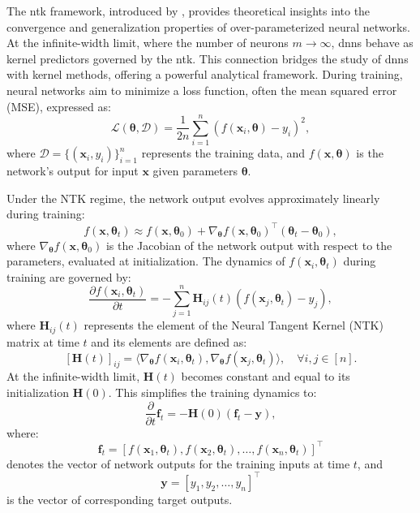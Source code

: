 

The \ac{ntk} framework, introduced by \citet{jacot2018neural}, provides theoretical insights into the convergence and generalization properties of over-parameterized neural networks. At the infinite-width limit, where the number of neurons \( m \to \infty \), \acp{dnn} behave as kernel predictors governed by the \ac{ntk}. This connection bridges the study of \acp{dnn} with kernel methods, offering a powerful analytical framework. During training, neural networks aim to minimize a loss function, often the mean squared error (MSE), expressed as:
\[
\mathcal{L}(\boldsymbol{\theta}, \mathcal{D}) = \frac{1}{2n} \sum_{i=1}^n (f(\mathbf{x}_i, \boldsymbol{\theta}) - y_i)^2,
\]
where \( \mathcal{D} = \{(\mathbf{x}_i, y_i)\}_{i=1}^n \) represents the training data, and \( f(\mathbf{x}, \boldsymbol{\theta}) \) is the network's output for input \( \mathbf{x} \) given parameters \( \boldsymbol{\theta} \).

Under the NTK regime, the network output evolves approximately linearly during training:
\[
f(\mathbf{x}, \boldsymbol{\theta}_t) \approx f(\mathbf{x}, \boldsymbol{\theta}_0) + \nabla_{\boldsymbol{\theta}} f(\mathbf{x}, \boldsymbol{\theta}_0)^\top (\boldsymbol{\theta}_t - \boldsymbol{\theta}_0),
\]
where \( \nabla_{\boldsymbol{\theta}} f(\mathbf{x}, \boldsymbol{\theta}_0) \) is the Jacobian of the network output with respect to the parameters, evaluated at initialization. The dynamics of \( f(\mathbf{x}_i, \boldsymbol{\theta}_t) \) during training are governed by:
\[
\frac{\partial f(\mathbf{x}_i, \boldsymbol{\theta}_t)}{\partial t} = -\sum_{j=1}^n \mathbf{H}_{ij}(t) \left( f(\mathbf{x}_j, \boldsymbol{\theta}_t) - y_j \right),
\]
where \( \mathbf{H}_{ij}(t) \) represents the element of the Neural Tangent Kernel (NTK) matrix at time \( t \) and its elements are defined as:
\[
[\mathbf{H}(t)]_{ij} = \langle \nabla_{\boldsymbol{\theta}} f(\mathbf{x}_i, \boldsymbol{\theta}_t), \nabla_{\boldsymbol{\theta}} f(\mathbf{x}_j, \boldsymbol{\theta}_t) \rangle, \quad \forall i, j \in [n].
\]
At the infinite-width limit, \( \mathbf{H}(t) \) becomes constant and equal to its initialization \( \mathbf{H}(0) \). This simplifies the training dynamics to:
\[
\frac{\partial}{\partial t} \mathbf{f}_t = -\mathbf{H}(0)(\mathbf{f}_t - \mathbf{y}),
\]
where:
\[
\mathbf{f}_t = [f(\mathbf{x}_1, \boldsymbol{\theta}_t), f(\mathbf{x}_2, \boldsymbol{\theta}_t), \ldots, f(\mathbf{x}_n, \boldsymbol{\theta}_t)]^\top
\]
denotes the vector of network outputs for the training inputs at time \( t \), and
\[
\mathbf{y} = [y_1, y_2, \ldots, y_n]^\top
\]
is the vector of corresponding target outputs.

